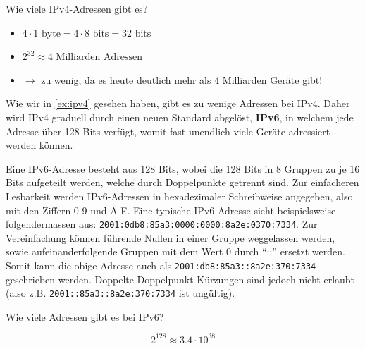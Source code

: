 \begin{myexercise}\label{ex:ipv4}
	Wie viele \gls{IP}v4-Adressen gibt es?
	\begin{myanswer}
		\begin{itemize}
			\item $4\cdot 1 \text{ byte} = 4\cdot 8 \text{ bits} = 32 \text{ bits}$
			\item $2^{32} \approx 4 \text{ Milliarden Adressen}$
			\item $\rightarrow$ zu wenig, da es heute deutlich mehr als 4 Milliarden Geräte gibt!
		\end{itemize}
	\end{myanswer}
\end{myexercise}
Wie wir in \cref{ex:ipv4} gesehen haben, gibt es zu wenige Adressen bei \gls{IP}v4. Daher wird \gls{IP}v4 graduell durch einen neuen Standard abgelöst, \textbf{\gls{IP}v6}, in welchem jede Adresse über 128 Bits verfügt, womit fast unendlich viele Geräte adressiert werden können.

\begin{mydefinition}
Eine \gls{IP}v6-Adresse besteht aus 128 Bits, wobei die 128 Bits in 8 Gruppen zu je 16 Bits aufgeteilt werden, welche durch Doppelpunkte getrennt sind. Zur einfacheren Lesbarkeit werden \gls{IP}v6-Adressen in hexadezimaler Schreibweise angegeben, also mit den Ziffern 0-9 und A-F. Eine typische \gls{IP}v6-Adresse sieht beispielsweise folgendermassen aus: \texttt{2001:0db8:85a3:0000:0000:8a2e:0370:7334}. Zur Vereinfachung können führende Nullen in einer Gruppe weggelassen werden, sowie aufeinanderfolgende Gruppen mit dem Wert 0 durch \enquote{::} ersetzt werden. Somit kann die obige Adresse auch als \texttt{2001:db8:85a3::8a2e:370:7334} geschrieben werden. Doppelte Doppelpunkt-Kürzungen sind jedoch nicht erlaubt (also z.B. \texttt{2001::85a3::8a2e:370:7334} ist ungültig).
\end{mydefinition}

\begin{myexercise}
	Wie viele Adressen gibt es bei IPv6?
	\begin{myanswer}
		\[2^{128} \approx 3.4\cdot 10^{38}\]
	\end{myanswer}
\end{myexercise}

